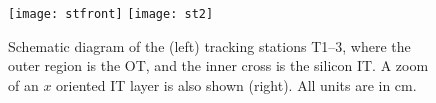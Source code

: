 \begin{figure}
  \begin{center}
    \texttt{[image: stfront]}
    \texttt{[image: st2]}
  \end{center}
  \caption[\lhcb tracking stations]
  {\small
      Schematic diagram of the (left) tracking stations T1--3, where the outer region is the OT,
      and the inner cross is the silicon IT.
      A zoom of an $x$ oriented IT layer is also shown (right).
      All units are in cm.
  }
  \label{fig:lhcb:tracking}
\end{figure}






